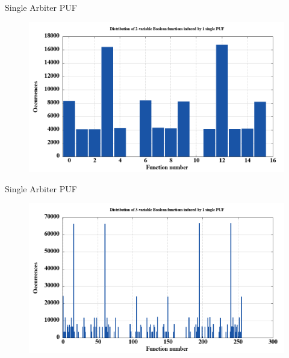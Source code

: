 \documentclass[10pt, compress]{beamer}
\begin{document}
\begin{frame}{Single Arbiter PUF}
    \begin{figure}
        \centering
        \includegraphics[width=\textwidth]{figures/dist/distribution_of_2-variable_boolean_functions_induced_by_1_single_puf.png}
    \end{figure}
\end{frame}

\begin{frame}{Single Arbiter PUF}
    \begin{figure}
        \centering
        \includegraphics[width=\textwidth]{figures/dist/distribution_of_3-variable_boolean_functions_induced_by_1_single_puf.png}
    \end{figure}
\end{frame}
\end{document}
